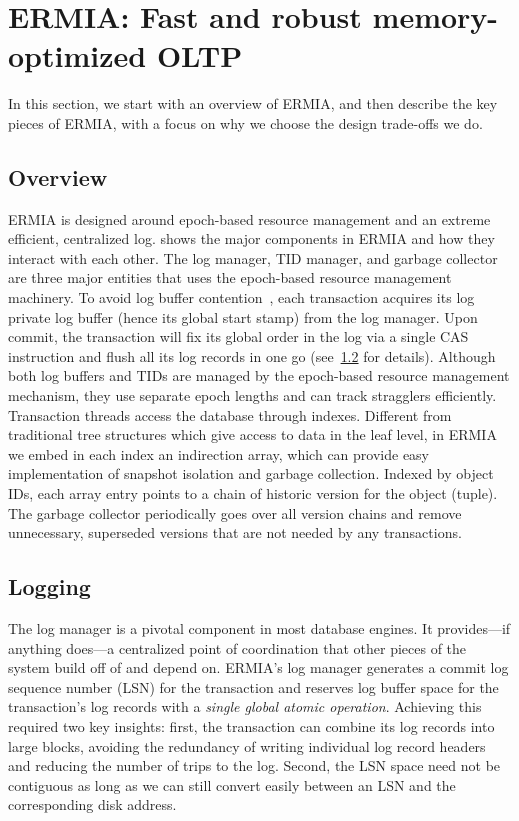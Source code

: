
\section{ERMIA: Fast and robust memory-optimized OLTP}
In this section, we start with an overview of ERMIA, and then describe the key pieces of ERMIA, with a focus on why we choose the design trade-offs we do.

\subsection{Overview}
ERMIA is designed around epoch-based resource management and an extreme efficient, centralized log.  shows the major components in ERMIA and how they interact with each other. The log manager, TID manager, and garbage collector are three major entities that uses the epoch-based resource management machinery. To avoid log buffer contention~\cite{WangJ14}, each transaction acquires its log private log buffer (hence its global start stamp) from the log manager. Upon commit, the transaction will fix its global order in the log via a single CAS instruction and flush all its log records in one go (see~\ref{subsec:logging} for details). Although both log buffers and TIDs are managed by the epoch-based resource management mechanism, they use separate epoch lengths and can track stragglers efficiently. Transaction threads access the database through indexes. Different from traditional tree structures which give access to data in the leaf level, in ERMIA we embed in each index an indirection array, which can provide easy implementation of snapshot isolation and garbage collection. Indexed by object IDs, each array entry points to a chain of historic version for the object (tuple). The garbage collector periodically goes over all version chains and remove unnecessary, superseded versions that are not needed by any transactions.

\subsection{Logging}
\label{subsec:logging}
The log manager is a pivotal component in most database engines. It provides---if anything does---a centralized point of coordination that other pieces of the system build off of and depend on. ERMIA's log manager generates a commit log sequence number (LSN) for the transaction and reserves log buffer space for the transaction's log records with a \textit{single global atomic operation}. Achieving this required two key insights: first, the transaction can combine its log records into large blocks, avoiding the redundancy of writing individual log record headers and reducing the number of trips to the log. Second, the LSN space need not be contiguous as long as we can still convert easily between an LSN and the corresponding disk address.

